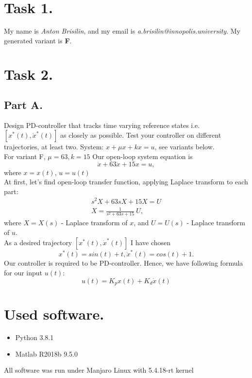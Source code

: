 \documentclass[a4paper,12pt]{article}
\begin{document}
\section{Task 1.}
My name is \textit{Anton Brisilin}, and my email is 
\textit{a.brisilin@innopolis.university}. 
My generated variant is \textbf{F}.
\section{Task 2.}
\subsection*{Part A.}
Design PD-controller that tracks time varying reference states i.e.
$[x^*(t), \dot{x}^*(t)]$ as closely as possible. Test your controller on different
trajectories, at least two. System: $x + \mu x + kx = u$, see variants below.\\
For variant F, $\mu = 63, k = 15$
Our open-loop system equation is 
\begin{equation}
    \ddot{x}+63\ddot{x}+15x=u,
\end{equation}
where $x=x(t)$, $u=u(t)$\\
At first, let's find open-loop transfer function, applying Laplace transform 
to each part:
\begin{eqnarray*}
    s^2X+63 sX+15X=U\\
    X = \frac{1}{s^2+63 s + 15}\ U,
\end{eqnarray*}
where $X=X(s)$ - Laplace transform of $x$, and $U=U(s)$ - Laplace transform of $u$.\\
As a desired trajectory $[x^*(t), \dot{x}^*(t)]$ I have chosen 
\begin{equation}
    x^*(t)=sin(t)+t, 
    \dot{x}^*(t)=cos(t)+1.
\end{equation}
Our controller is required to be PD-controller. Hence, we have following formula
for our input $u(t)$:
\begin{equation}
    u(t) = K_p x(t) + K_d\dot{x}(t)
\end{equation}
\section{Used software.}
\begin{itemize}
    \item Python 3.8.1
    \item Matlab R2018b 9.5.0
\end{itemize}
All software was run under Manjaro Linux with 5.4.18-rt kernel
\end{document}
